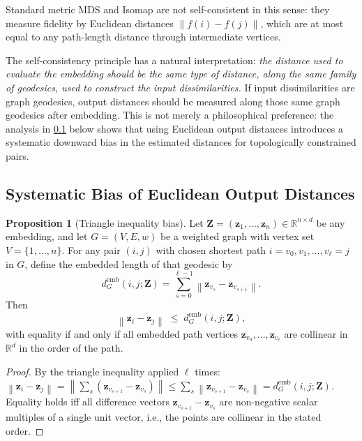 \documentclass[11pt]{article}
\theoremstyle{definition}
\newtheorem{proposition}[definition]{Proposition}
\newcommand{\R}{\mathbb{R}}
\newcommand{\bz}{\mathbf{z}}
\newcommand{\bZ}{\mathbf{Z}}
\newcommand{\norm}[1]{\left\|#1\right\|}
\newcommand{\demb}{d^{\mathrm{emb}}}
\begin{document}
Standard metric MDS and Isomap are not self-consistent in this sense:
they measure fidelity by Euclidean distances $\norm{f(i) - f(j)}$, which
are at most equal to any path-length distance through intermediate vertices.

The self-consistency principle has a natural interpretation:
\emph{the distance used to evaluate the embedding should be the same
  type of distance, along the same family of geodesics, used to construct
  the input dissimilarities.}
If input dissimilarities are graph geodesics, output distances should be
measured along those same graph geodesics after embedding.  This is not
merely a philosophical preference: the
analysis in \cref{sec:systematic_bias} below shows that using Euclidean
output distances introduces a systematic downward bias in the estimated
distances for topologically constrained pairs.

\subsection{Systematic Bias of Euclidean Output Distances}
\label{sec:systematic_bias}

\begin{proposition}[Triangle inequality bias]
  \label{prop:bias}
  Let $\bZ = (\bz_1, \ldots, \bz_n) \in \R^{n \times d}$ be any embedding,
  and let $G = (V, E, w)$ be a weighted graph with vertex set $V = \{1,
  \ldots, n\}$.  For any pair $(i,j)$ with chosen shortest path
  $i = v_0, v_1, \ldots, v_\ell = j$ in $G$, define the embedded length of
  that geodesic by
  \begin{equation}
    \demb_G(i,j;\bZ)
    = \sum_{s=0}^{\ell-1} \norm{\bz_{v_s} - \bz_{v_{s+1}}}.
    \label{eq:emb_geo}
  \end{equation}
  Then
  \begin{equation}
    \norm{\bz_i - \bz_j} \;\leq\; \demb_G(i,j;\bZ),
    \label{eq:triangle_bias}
  \end{equation}
  with equality if and only if all embedded path vertices
  $\bz_{v_0}, \ldots, \bz_{v_\ell}$ are collinear in $\R^d$ in the order
  of the path.
\end{proposition}

\begin{proof}
  By the triangle inequality applied $\ell$ times:
  $\norm{\bz_i - \bz_j} = \norm{\sum_{s} (\bz_{v_{s+1}} - \bz_{v_s})}
  \leq \sum_s \norm{\bz_{v_{s+1}} - \bz_{v_s}} = \demb_G(i,j;\bZ)$.
  Equality holds iff all difference vectors $\bz_{v_{s+1}} - \bz_{v_s}$
  are non-negative scalar multiples of a single unit vector, i.e., the
  points are collinear in the stated order.
\end{proof}
\end{document}
